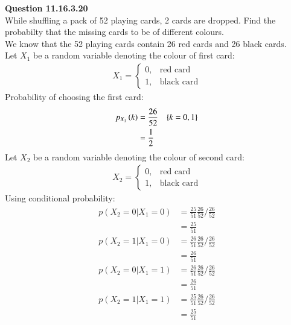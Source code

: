 \documentclass[journal,12pt,onecolumn]{IEEEtran}
\begin{document}
\vspace{3cm}
\title{}
\author{EE22BTECH11029 - Komakula Sreeja}
\maketitle
\textbf{Question 11.16.3.20}\\
While shuffling a pack of 52 playing cards, 2 cards are dropped. Find the probabilty that the missing cards to be of different colours.\\
\solution
We know that the 52 playing cards contain 26 red cards and 26 black cards.\\
Let $X_1$ be a random variable denoting the colour of first card:
\begin{align}
         X_1 = 
         \begin{cases}
                0, & \text{red card}\\
                1, & \text{black card}
         \end{cases}
\end{align}
Probability of choosing the first card:
\begin{align}
         p_{X_1}\left(k\right) &= \frac{26}{52} \quad \{k=0,1\}\\
                         &= \frac{1}{2}
\end{align} 
Let $X_2$ be a random variable denoting the colour of second card:    
\begin{align}
         X_2 = 
         \begin{cases}
                0, & \text{red card}\\
                1, & \text{black card}
         \end{cases}
\end{align}
Using conditional probability:
\begin{align}
          p(X_2=0|X_1=0) &= \frac{25}{51}\frac{26}{52}/\frac{26}{52}\\
                        &= \frac{25}{51}\\
          p(X_2=1|X_1=0) &= \frac{26}{51}\frac{26}{52}/\frac{26}{52}\\
                        &= \frac{26}{51}\\
          p(X_2=0|X_1=1) &= \frac{26}{51}\frac{26}{52}/\frac{26}{52}\\
                        &= \frac{26}{51}\\
          p(X_2=1|X_1=1) &= \frac{25}{51}\frac{26}{52}/\frac{26}{52}\\
                        &= \frac{25}{51} 
\end{align}                   
\end{document}
